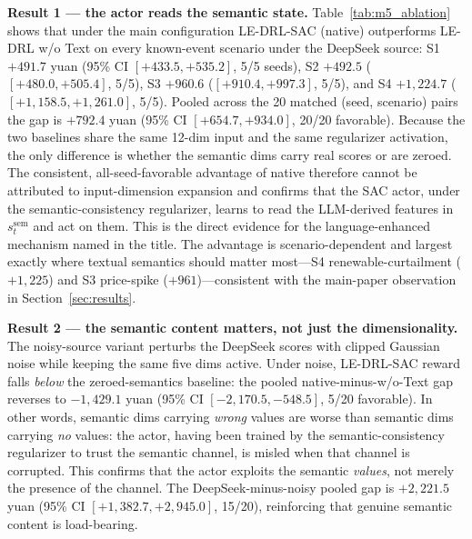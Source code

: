 \textbf{Result 1 — the actor reads the semantic state.} Table~\ref{tab:m5_ablation}
shows that under the main configuration LE-DRL-SAC (native) outperforms LE-DRL w/o
Text on every known-event scenario under the DeepSeek source: S1 $+491.7$ yuan
(95\% CI $[+433.5, +535.2]$, 5/5 seeds), S2 $+492.5$ ($[+480.0, +505.4]$, 5/5),
S3 $+960.6$ ($[+910.4, +997.3]$, 5/5), and S4 $+1{,}224.7$ ($[+1{,}158.5, +1{,}261.0]$,
5/5). Pooled across the 20 matched (seed, scenario) pairs the gap is $+792.4$ yuan
(95\% CI $[+654.7, +934.0]$, 20/20 favorable). Because the two baselines share the
same 12-dim input and the same regularizer activation, the only difference is whether
the semantic dims carry real scores or are zeroed. The consistent, all-seed-favorable
advantage of native therefore cannot be attributed to input-dimension expansion and
confirms that the SAC actor, under the semantic-consistency regularizer, learns to
read the LLM-derived features in $s^{\mathrm{sem}}_t$ and act on them. This is the
direct evidence for the language-enhanced mechanism named in the title. The advantage
is scenario-dependent and largest exactly where textual semantics should matter
most---S4 renewable-curtailment ($+1{,}225$) and S3 price-spike ($+961$)---consistent
with the main-paper observation in Section~\ref{sec:results}.

\textbf{Result 2 — the semantic content matters, not just the dimensionality.}
The noisy-source variant perturbs the DeepSeek scores with clipped Gaussian noise
while keeping the same five dims active. Under noise, LE-DRL-SAC reward falls
\emph{below} the zeroed-semantics baseline: the pooled native-minus-w/o-Text gap
reverses to $-1{,}429.1$ yuan (95\% CI $[-2{,}170.5, -548.5]$, 5/20 favorable).
In other words, semantic dims carrying \emph{wrong} values are worse than semantic
dims carrying \emph{no} values: the actor, having been trained by the
semantic-consistency regularizer to trust the semantic channel, is misled when
that channel is corrupted. This confirms that the actor exploits the semantic
\emph{values}, not merely the presence of the channel. The DeepSeek-minus-noisy
pooled gap is $+2{,}221.5$ yuan (95\% CI $[+1{,}382.7, +2{,}945.0]$, 15/20),
reinforcing that genuine semantic content is load-bearing.

